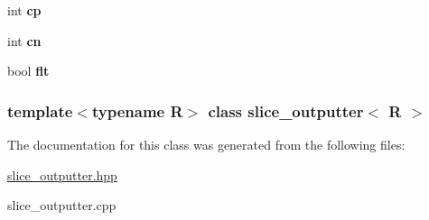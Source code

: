 \begin{DoxyCompactItemize}
\item 
\hypertarget{classslice__outputter_ab54a5b462f4ca3f3ef4c433177b2ef42}{
int {\bfseries cp}}
\label{classslice__outputter_ab54a5b462f4ca3f3ef4c433177b2ef42}

\item 
\hypertarget{classslice__outputter_a847f8e4abb0bcf1f9ee5ee3269949c6b}{
int {\bfseries cn}}
\label{classslice__outputter_a847f8e4abb0bcf1f9ee5ee3269949c6b}

\item 
\hypertarget{classslice__outputter_a3bebcc32ced0b853a9637d3ffd0af6dd}{
bool {\bfseries flt}}
\label{classslice__outputter_a3bebcc32ced0b853a9637d3ffd0af6dd}

\end{DoxyCompactItemize}
\subsubsection*{template$<$typename R$>$ class slice\_\-outputter$<$ R $>$}



The documentation for this class was generated from the following files:\begin{DoxyCompactItemize}
\item 
\hyperlink{slice__outputter_8hpp}{slice\_\-outputter.hpp}\item 
slice\_\-outputter.cpp\end{DoxyCompactItemize}
